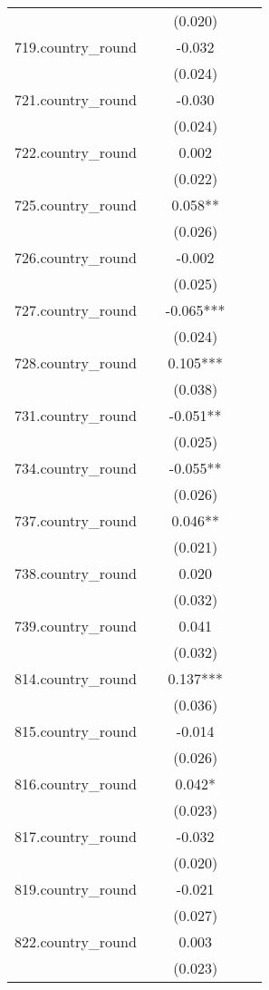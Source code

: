 \documentclass[]{article}
\begin{document}
\begin{tabular}{lcccc}
 &  & (0.020) &  &  \\
719.country\_round &  & -0.032 &  &  \\
 &  & (0.024) &  &  \\
721.country\_round &  & -0.030 &  &  \\
 &  & (0.024) &  &  \\
722.country\_round &  & 0.002 &  &  \\
 &  & (0.022) &  &  \\
725.country\_round &  & 0.058** &  &  \\
 &  & (0.026) &  &  \\
726.country\_round &  & -0.002 &  &  \\
 &  & (0.025) &  &  \\
727.country\_round &  & -0.065*** &  &  \\
 &  & (0.024) &  &  \\
728.country\_round &  & 0.105*** &  &  \\
 &  & (0.038) &  &  \\
731.country\_round &  & -0.051** &  &  \\
 &  & (0.025) &  &  \\
734.country\_round &  & -0.055** &  &  \\
 &  & (0.026) &  &  \\
737.country\_round &  & 0.046** &  &  \\
 &  & (0.021) &  &  \\
738.country\_round &  & 0.020 &  &  \\
 &  & (0.032) &  &  \\
739.country\_round &  & 0.041 &  &  \\
 &  & (0.032) &  &  \\
814.country\_round &  & 0.137*** &  &  \\
 &  & (0.036) &  &  \\
815.country\_round &  & -0.014 &  &  \\
 &  & (0.026) &  &  \\
816.country\_round &  & 0.042* &  &  \\
 &  & (0.023) &  &  \\
817.country\_round &  & -0.032 &  &  \\
 &  & (0.020) &  &  \\
819.country\_round &  & -0.021 &  &  \\
 &  & (0.027) &  &  \\
822.country\_round &  & 0.003 &  &  \\
 &  & (0.023) &  &  \\

\end{tabular}
\end{document}
